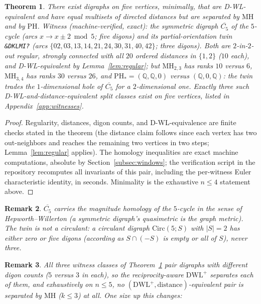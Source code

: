 \documentclass[pdflatex,sn-mathphys,Numbered]{sn-jnl}
\theoremstyle{thmstyleone}
\newtheorem{theorem}{Theorem}[section]
\theoremstyle{thmstyletwo}
\newtheorem{remark}[theorem]{Remark}
\newcommand{\MH}{\mathrm{MH}}
\newcommand{\PH}{\mathrm{PH}}
\newcommand{\QQ}{\mathbb{Q}}
\newcommand{\dwlp}{\mathrm{DWL}^{+}}
\begin{document}
\begin{theorem}\label{thm:beyonddist}
There exist digraphs on five vertices, minimally, that are
D-WL-equivalent and have equal multisets of directed distances but are
separated by $\MH$ and by $\PH$. Witness (machine-verified, exact): the
symmetric digraph $\overline{C_5}$ of the $5$-cycle
(arcs $x \to x \pm 2 \bmod 5$; five digons) and its partial-orientation
twin \texttt{\&DKLMI?} (arcs
$\{02, 03, 13, 14, 21, 24, 30, 31, 40, 42\}$; three digons). Both are
$2$-in-$2$-out regular, strongly connected with all $20$ ordered
distances in $\{1, 2\}$ ($10$ each), and D-WL-equivalent by
Lemma~\ref{lem:regular}; but $\MH_{2,3}$ has ranks $10$ versus $6$,
$\MH_{3,4}$ has ranks $30$ versus $26$, and
$\PH_\ast = (\QQ, \QQ, 0)$ versus $(\QQ, 0, \QQ)$: the twin trades the
$1$-dimensional hole of $\overline{C_5}$ for a $2$-dimensional one.
Exactly three such D-WL-and-distance-equivalent split classes exist on
five vertices, listed in Appendix~\ref{app:witnesses}.
\end{theorem}

\begin{proof}
Regularity, distances, digon counts, and D-WL-equivalence are finite
checks stated in the theorem (the distance claim follows since each
vertex has two out-neighbors and reaches the remaining two vertices in
two steps; Lemma~\ref{lem:regular} applies). The homology inequalities
are exact machine computations, absolute by
Section~\ref{subsec:windows}; the verification script in the repository
recomputes all invariants of this pair, including the per-witness Euler
characteristic identity, in seconds. Minimality is the exhaustive
$n \le 4$ statement above.
\end{proof}

\begin{remark}
$\overline{C_5}$ carries the magnitude homology of the $5$-cycle in the
sense of Hepworth--Willerton (a symmetric digraph's quasimetric is the
graph metric). The twin is not a circulant: a circulant digraph
$\mathrm{Circ}(5; S)$ with $|S| = 2$ has either zero or five digons
(according as $S \cap (-S)$ is empty or all of $S$), never three.
\end{remark}

\begin{remark}\label{rem:digons}
All three witness classes of Theorem~\ref{thm:beyonddist} pair digraphs
with different digon counts ($5$ versus $3$ in each), so the
reciprocity-aware $\dwlp$ separates each of them, and exhaustively on
$n \le 5$, no $(\dwlp, \text{distance})$-equivalent pair is separated by
$\MH$ ($k \le 3$) at all. One size up this changes:
\end{remark}
\end{document}

